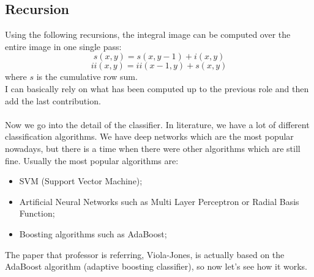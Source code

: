 \subsection{Recursion}
Using the following recursions, the integral image can be computed over the entire image in one single pass:
\[s(x,y)=s(x,y-1)+i(x,y)\]
\[ii(x,y)=ii(x-1,y)+s(x,y)\]
where $s$ is the cumulative row sum.
\\I can basically rely on what has been computed up to the previous role and then add the last contribution.
\\
\\
Now we go into the detail of the classifier. In literature, we have a lot of different classification algorithms. We have deep networks which are the most popular nowadays, but there is a time when there were other algorithms which are still fine.
Usually the most popular algorithms are:
\begin{itemize}
    \item SVM (Support Vector Machine);
    \item Artificial Neural Networks such as Multi Layer Perceptron or Radial Basis Function;
    \item Boosting algorithms such as AdaBoost;
\end{itemize}
The paper that professor is referring, Viola-Jones, is actually based on the AdaBoost algorithm (adaptive boosting classifier), so now let's see how it works.
